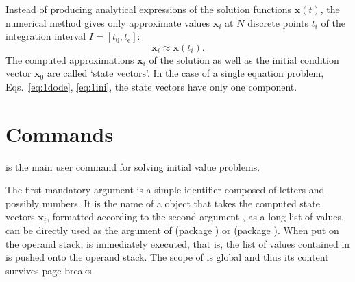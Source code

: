 \documentclass[11pt,english,BCOR10mm,DIV12,bibliography=totoc,parskip=false,smallheadings
    headexclude,footexclude,oneside,dvips,UKenglish]{pst-doc}
\begin{document}
Instead of producing analytical expressions of the solution functions $\mathbf{x}(t)$, the numerical method gives only approximate values $\mathbf{x}_i$ at $N$ discrete points $t_i$ of the integration interval $I=[t_0, t_\mathrm{e}]$:
\begin{equation}
\mathbf{x}_i\approx\mathbf{x}(t_i).
\end{equation}
The computed approximations $\mathbf{x}_i$ of the solution as well as the initial condition vector $\mathbf{x}_0$ are called `state vectors'. In the case of a single equation problem, Eqs.~\eqref{eq:1dode}, \eqref{eq:1ini}, the state vectors have only one component.

\section{Commands}
\begin{BDef}
    \OptArgs{}
\end{BDef}
is the main user command for solving initial value problems.

The first mandatory argument  is a simple identifier composed of letters and possibly numbers. It is the name of a \PS{} object that takes the computed state vectors $\mathbf{x}_i$, formatted according to the second argument , as a long list of values.  can be directly used as the  argument of  (package ) or  (package ). When put on the \PS{} operand stack,  is immediately executed, that is, the list of values contained in  is pushed onto the operand stack. The scope of  is global and thus its content survives page breaks.
\end{document}
